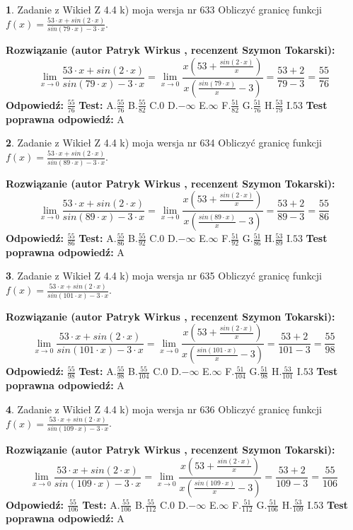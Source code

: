 \documentclass[12pt, a4paper]{article}
\theoremstyle{definition} %
\newtheorem{zad}{}
\newcommand{\zadStart}[1]{\begin{zad}#1\newline}
\newcommand{\zadStop}{\end{zad}}
\newcommand{\rozwStart}[2]{\noindent \textbf{Rozwiązanie (autor #1 , recenzent #2): }\newline}
\newcommand{\rozwStop}{\newline}
\newcommand{\odpStart}{\noindent \textbf{Odpowiedź:}\newline}
\newcommand{\odpStop}{\newline}
\newcommand{\testStart}{\noindent \textbf{Test:}\newline}
\newcommand{\testStop}{\newline}
\newcommand{\kluczStart}{\noindent \textbf{Test poprawna odpowiedź:}\newline}
\newcommand{\kluczStop}{\newline}
\begin{document}
\zadStart{Zadanie z Wikieł Z 4.4 k) moja wersja nr 633}
Obliczyć granicę funkcji $f(x)=\frac{53\cdot x +sin(2\cdot x)}{sin(79\cdot x) -3\cdot x}$.
\zadStop
\rozwStart{Patryk Wirkus}{Szymon Tokarski}
$$\lim\limits_{x\to 0}\frac{53\cdot x +sin(2\cdot x)}{sin(79\cdot x) -3\cdot x}
=\lim\limits_{x\to 0}\frac{x(53+\frac{sin(2\cdot x)}{x})}{x(\frac{sin(79\cdot x)}{x}-3)}
=\frac{53+2}{79-3} = \frac{55}{76}$$
\rozwStop
\odpStart
$\frac{55}{76}$
\odpStop
\testStart
A.$\frac{55}{76}$
B.$\frac{55}{82}$
C.$0$
D.$-\infty$
E.$\infty$
F.$\frac{51}{82}$
G.$\frac{51}{76}$
H.$\frac{53}{79}$
I.$53$
\testStop
\kluczStart
A
\kluczStop



\zadStart{Zadanie z Wikieł Z 4.4 k) moja wersja nr 634}
Obliczyć granicę funkcji $f(x)=\frac{53\cdot x +sin(2\cdot x)}{sin(89\cdot x) -3\cdot x}$.
\zadStop
\rozwStart{Patryk Wirkus}{Szymon Tokarski}
$$\lim\limits_{x\to 0}\frac{53\cdot x +sin(2\cdot x)}{sin(89\cdot x) -3\cdot x}
=\lim\limits_{x\to 0}\frac{x(53+\frac{sin(2\cdot x)}{x})}{x(\frac{sin(89\cdot x)}{x}-3)}
=\frac{53+2}{89-3} = \frac{55}{86}$$
\rozwStop
\odpStart
$\frac{55}{86}$
\odpStop
\testStart
A.$\frac{55}{86}$
B.$\frac{55}{92}$
C.$0$
D.$-\infty$
E.$\infty$
F.$\frac{51}{92}$
G.$\frac{51}{86}$
H.$\frac{53}{89}$
I.$53$
\testStop
\kluczStart
A
\kluczStop



\zadStart{Zadanie z Wikieł Z 4.4 k) moja wersja nr 635}
Obliczyć granicę funkcji $f(x)=\frac{53\cdot x +sin(2\cdot x)}{sin(101\cdot x) -3\cdot x}$.
\zadStop
\rozwStart{Patryk Wirkus}{Szymon Tokarski}
$$\lim\limits_{x\to 0}\frac{53\cdot x +sin(2\cdot x)}{sin(101\cdot x) -3\cdot x}
=\lim\limits_{x\to 0}\frac{x(53+\frac{sin(2\cdot x)}{x})}{x(\frac{sin(101\cdot x)}{x}-3)}
=\frac{53+2}{101-3} = \frac{55}{98}$$
\rozwStop
\odpStart
$\frac{55}{98}$
\odpStop
\testStart
A.$\frac{55}{98}$
B.$\frac{55}{104}$
C.$0$
D.$-\infty$
E.$\infty$
F.$\frac{51}{104}$
G.$\frac{51}{98}$
H.$\frac{53}{101}$
I.$53$
\testStop
\kluczStart
A
\kluczStop



\zadStart{Zadanie z Wikieł Z 4.4 k) moja wersja nr 636}
Obliczyć granicę funkcji $f(x)=\frac{53\cdot x +sin(2\cdot x)}{sin(109\cdot x) -3\cdot x}$.
\zadStop
\rozwStart{Patryk Wirkus}{Szymon Tokarski}
$$\lim\limits_{x\to 0}\frac{53\cdot x +sin(2\cdot x)}{sin(109\cdot x) -3\cdot x}
=\lim\limits_{x\to 0}\frac{x(53+\frac{sin(2\cdot x)}{x})}{x(\frac{sin(109\cdot x)}{x}-3)}
=\frac{53+2}{109-3} = \frac{55}{106}$$
\rozwStop
\odpStart
$\frac{55}{106}$
\odpStop
\testStart
A.$\frac{55}{106}$
B.$\frac{55}{112}$
C.$0$
D.$-\infty$
E.$\infty$
F.$\frac{51}{112}$
G.$\frac{51}{106}$
H.$\frac{53}{109}$
I.$53$
\testStop
\kluczStart
A
\kluczStop
\end{document}

